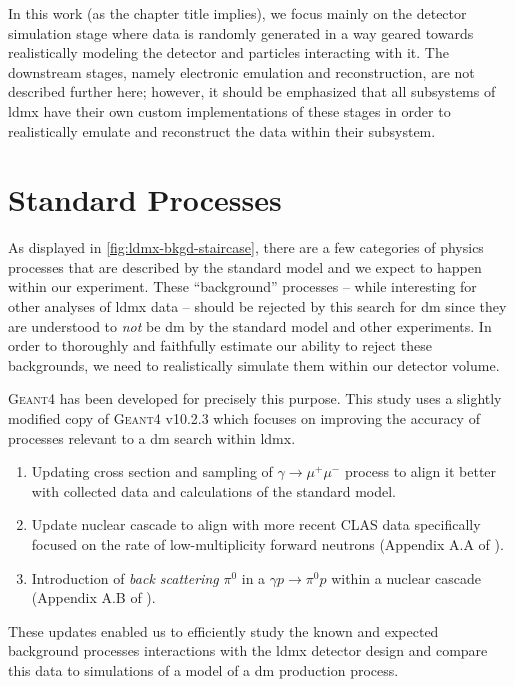 In this work (as the chapter title implies), we focus mainly on the detector simulation stage where data is randomly generated in a way geared towards realistically modeling the detector and particles interacting with it. The downstream stages, namely electronic emulation and reconstruction, are not described further here; however, it should be emphasized that all subsystems of \ac{ldmx} have their own custom implementations of these stages in order to realistically emulate and reconstruct the data within their subsystem.

\section{Standard Processes}
As displayed in \cref{fig:ldmx-bkgd-staircase}, there are a few categories of physics processes that are described by the standard model and we expect to happen within our experiment. These ``background'' processes -- while interesting for other analyses of \ac{ldmx} data -- should be rejected by this search for \ac{dm} since they are understood to \emph{not} be \ac{dm} by the standard model and other experiments. In order to thoroughly and faithfully estimate our ability to reject these backgrounds, we need to realistically simulate them within our detector volume.

\textsc{Geant4} \cite{geant4} has been developed for precisely this purpose. This study uses a slightly modified copy of \textsc{Geant4} v10.2.3 which focuses on improving the accuracy of processes relevant to a \ac{dm} search within \ac{ldmx}.
\begin{enumerate}
    \item Updating cross section and sampling of $\gamma\to\mu^+\mu^-$ process to align it better with collected data and calculations of the standard model.
    \item Update nuclear cascade to align with more recent CLAS data specifically focused on the rate of low-multiplicity forward neutrons (Appendix A.A of \cite{ldmx-whitepaper}).
    \item Introduction of \emph{back scattering} $\pi^0$ in a $\gamma p \to \pi^0 p$ within a nuclear cascade (Appendix A.B of \cite{ldmx-whitepaper}).
\end{enumerate}
These updates enabled us to efficiently study the known and expected background processes interactions with the \ac{ldmx} detector design and compare this data to simulations of a model of a \ac{dm} production process.

